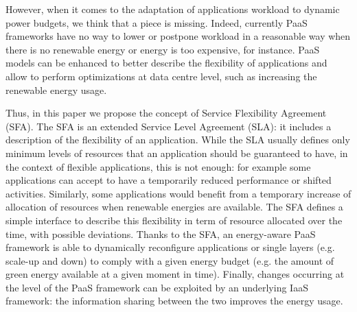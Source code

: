 However, when it comes to the adaptation of applications workload to dynamic power budgets, we think that a piece is missing.
Indeed, currently PaaS frameworks have no way to lower or postpone workload in a reasonable way when there is no renewable energy or energy is too expensive, for instance.
PaaS models can be enhanced to better describe the flexibility of applications and allow to perform optimizations at data centre level, such as increasing the renewable energy usage.

Thus, in this paper we propose the concept of Service Flexibility Agreement (SFA). 
The SFA is an extended Service Level Agreement (SLA): it includes a description of the flexibility of an application.
While the SLA usually defines only minimum levels of resources that an application should be guaranteed to have, in the context of flexible applications, this is not enough: for example some applications can accept to have a temporarily reduced performance or shifted activities.
Similarly, some applications would benefit from a temporary increase of allocation of resources when renewable energies are available.
The SFA defines a simple interface to describe this flexibility in term of resource allocated over the time, with possible deviations. 
Thanks to the SFA, an energy-aware PaaS framework is able to dynamically reconfigure applications or single layers (e.g. scale-up and down) to comply with a given energy budget (e.g. the amount of green energy available at a given moment in time).
Finally, changes occurring at the level of the PaaS framework can be exploited by an underlying IaaS framework: the information sharing between the two improves the energy usage.
